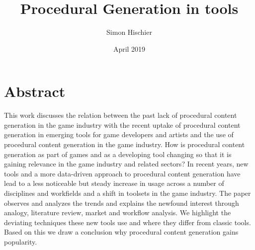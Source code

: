 \documentclass[10pt,a4paper]{article}
\title{Procedural Generation in tools}
\author{Simon Hischier}
\date{April 2019}
\begin{document}



\renewcommand{\contentsname}{Content}
\tableofcontents
\newpage

\section{Abstract}
\label{sec:abstract}
\begin{multicols}{2}
This work discusses the relation between the past lack of procedural content generation in the game industry with the recent uptake of procedural content generation in emerging tools for game developers and artists and the use of procedural content generation in the game industry. How is procedural content generation as part of games and as a developing tool changing so that it is gaining relevance in the game industry and related sectors? In recent years, new tools and a more data-driven approach to procedural content generation have lead to a less noticeable but steady increase in usage across a number of disciplines and workfields and a shift in toolsets in the game industry. The paper observes and analyzes the trends and explains the newfound interest through analogy, literature review, market and workflow analysis. We highlight the deviating techniques these new tools use and where they differ from classic tools. Based on this we draw a conclusion why procedural content generation gains popularity.
\end{multicols}
\end{document}
